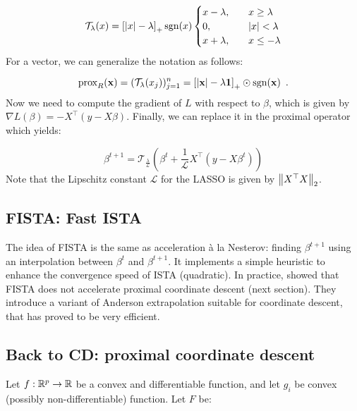 \documentclass[a4paper,10pt]{article}
\theoremstyle{definition}
\begin{document}
\begin{equation*}
    \mathcal{T}_{\lambda}(x) = \left[\lvert x \rvert - \lambda\right]_+ \text{sgn}(x)
    \begin{cases}
        x - \lambda,  \quad &x \geq \lambda \\
        0, \quad & \lvert x \rvert < \lambda \\
        x + \lambda, \quad &x \leq -\lambda
    \end{cases}
\end{equation*}
%
For a vector, we can generalize the notation as follows:

\begin{equation*}
    \text{prox}_R(\mathbf{x}) = (\mathcal{T}_{\lambda}(x_j))_{j=1}^n
    = \left[\lvert \mathbf{x} \rvert - \lambda \mathbf{1}\right]_+ \odot \text{sgn}(\mathbf{x})
    \enspace .
\end{equation*}
%
Now we need to compute the gradient of $L$ with respect to $\beta$, which is given by
$\nabla L(\beta) = -X^{\top}(y-X\beta)$. Finally, we can replace it in the proximal operator
which yields:

\begin{equation*}
    \beta^{t+1} = \mathcal{T}_{\frac{\lambda}{\mathcal{L}}}\left(
        \beta^{t} + \frac{1}{\mathcal{L}} X^{\top}(y-X\beta^t)
    \right)
\end{equation*}
%
Note that the Lipschitz constant $\mathcal{L}$ for the LASSO is given by $\left \lVert X^{\top}X \right \rVert_2$.

\subsection*{FISTA: Fast ISTA}

The idea of FISTA is the same as acceleration à la Nesterov: finding $\beta^{t+1}$ using
an interpolation between $\beta^t$ and $\beta^{t+1}$. It implements a simple heuristic to 
enhance the convergence speed of ISTA (quadratic). In practice, \cite{Bertrand_Massias_Anderson}
showed that FISTA does not accelerate proximal coordinate descent (next section). They
introduce a variant of Anderson extrapolation suitable for coordinate descent, that has 
proved to be very efficient.

\subsection*{Back to CD: proximal coordinate descent}

Let $f : \mathbb{R}^p \rightarrow \mathbb{R}$ be a convex and differentiable function, and let 
$g_i$ be convex (possibly non-differentiable) function. Let $F$ be:
\end{document}
